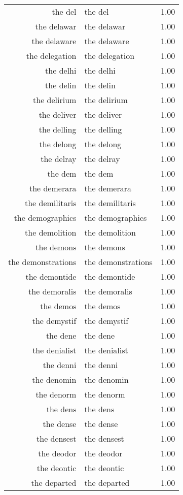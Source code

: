 \begin{table}[ht]
\begin{tabular}{rlr}
  the del & the del & 1.00 \\ 
  the delawar & the delawar & 1.00 \\ 
  the delaware & the delaware & 1.00 \\ 
  the delegation & the delegation & 1.00 \\ 
  the delhi & the delhi & 1.00 \\ 
  the delin & the delin & 1.00 \\ 
  the delirium & the delirium & 1.00 \\ 
  the deliver & the deliver & 1.00 \\ 
  the delling & the delling & 1.00 \\ 
  the delong & the delong & 1.00 \\ 
  the delray & the delray & 1.00 \\ 
  the dem & the dem & 1.00 \\ 
  the demerara & the demerara & 1.00 \\ 
  the demilitaris & the demilitaris & 1.00 \\ 
  the demographics & the demographics & 1.00 \\ 
  the demolition & the demolition & 1.00 \\ 
  the demons & the demons & 1.00 \\ 
  the demonstrations & the demonstrations & 1.00 \\ 
  the demontide & the demontide & 1.00 \\ 
  the demoralis & the demoralis & 1.00 \\ 
  the demos & the demos & 1.00 \\ 
  the demystif & the demystif & 1.00 \\ 
  the dene & the dene & 1.00 \\ 
  the denialist & the denialist & 1.00 \\ 
  the denni & the denni & 1.00 \\ 
  the denomin & the denomin & 1.00 \\ 
  the denorm & the denorm & 1.00 \\ 
  the dens & the dens & 1.00 \\ 
  the dense & the dense & 1.00 \\ 
  the densest & the densest & 1.00 \\ 
  the deodor & the deodor & 1.00 \\ 
  the deontic & the deontic & 1.00 \\ 
  the departed & the departed & 1.00 \\ 

\end{tabular}
\end{table}
